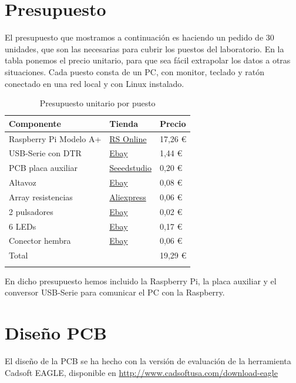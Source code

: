 \section{Presupuesto}

El presupuesto que mostramos a continuación es haciendo un pedido de 30 unidades, que
son las necesarias para cubrir los puestos del laboratorio. En la tabla ponemos
el precio unitario, para que sea fácil extrapolar los datos a otras situaciones. Cada
puesto consta de un PC, con monitor, teclado y ratón conectado en una red local y
con Linux instalado.

\begin{longtable}{ p{6cm} | p{4cm} | p{3cm}}
\hline
{\bf Componente} & {\bf Tienda} & {\bf Precio} \\ \hline
Raspberry Pi Modelo A+ & \href{http://es.rs-online.com/web/p/kits-de-desarrollo-de-procesador-y-microcontrolador/8332699/}{RS Online} & 17,26 € \\
USB-Serie con DTR & \href{http://www.ebay.com/itm//400565980256}{Ebay} & 1,44 € \\
PCB placa auxiliar & \href{http://seeedstudio.com/service/index.php?r=pcb}{Seeedstudio} & 0,20 € \\
Altavoz & \href{http://www.ebay.com/itm/261583913099}{Ebay} & 0,08 € \\
Array resistencias & \href{http://www.aliexpress.com/item//1936805890.html}{Aliexpress} & 0,06 € \\
2 pulsadores & \href{http://www.ebay.com/itm/261621014025}{Ebay} & 0,02 € \\
6 LEDs & \href{http://www.ebay.com/itm/281410599537}{Ebay} & 0,17 € \\
Conector hembra & \href{http://www.ebay.com/itm/271427325429}{Ebay} & 0,06 € \\ \hline
Total &  & 19,29 € \\ \hline
\caption{Presupuesto unitario por puesto}
\label{tab:presupuesto}
\end{longtable}

En dicho presupuesto hemos incluido la Raspberry Pi, la placa auxiliar y el conversor USB-Serie
para comunicar el PC con la Raspberry.

\section{Diseño PCB}

El diseño de la PCB se ha hecho con la versión de evaluación de la herramienta Cadsoft EAGLE,
disponible en \textcolor{blue}{
  \href{http://www.cadsoftusa.com/download-eagle}
  {http://www.cadsoftusa.com/download-eagle}}
 
